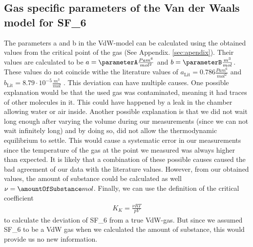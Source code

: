 \documentclass[a4paper,10pt,twocolumn]{article}
\begin{document}
    \subsection{Gas specific parameters of the Van der Waals model for SF_6\)}\label{subsec:gasSpecParams}
    The parameters a and b in the VdW-model can be calculated using the obtained values from the critical point of the gas (See Appendix. \ref{sec:apendix}).
    Their values are calculated to be $a = \parameterA \frac{Pa m^6}{mol^2}$ and $b =\parameterB \frac{m^3}{mol}$.
    These values do not coincide withe the literature values of $a_{\text{Lit}} = 0.786 \frac{Pa m^6}{mol^2}$ and $b_{\text{Lit}} = 8.79\cdot 10^{-5} \frac{m^3}{mol}$ \cite[crc]{2}.
    This deviation can have multiple causes.
    One possible explanation would be that the used gas was contaminated, meaning it had traces of other molecules in it.
    This could have happened by a leak in the chamber allowing water or air inside.
    Another possible explanation is that we did not wait long enough after varying the volume during our measurements (since we can not wait infinitely long) and by doing so, did not allow the thermodynamic equilibrium to settle.
    This would cause a systematic error in our measurements since the temperature of the gas at the point we measured was always higher than expected.
    It is likely that a combination of these possible causes caused the bad agreement of our data with the literature values.
    However, from our obtained values, the amount of substance could be calculated as well $\nu = \amountOfSubstance mol$.
    Finally, we can use the definition of the critical coefficient
    \begin{align}\label{eq:critcalCoeff}
        K_K = \frac{\nu RT}{pV}
    \end{align}
    to calculate the deviation of SF_6\) from a true VdW-gas.
    But since we assumed SF_6\) to be a VdW gas when we calculated the amount of substance, this would provide us no new information.
    
\end{document}
